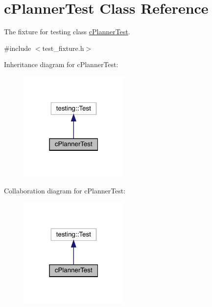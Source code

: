 \hypertarget{classc_planner_test}{}\section{c\+Planner\+Test Class Reference}
\label{classc_planner_test}


The fixture for testing class \mbox{\hyperlink{classc_planner_test}{c\+Planner\+Test}}.  




{\ttfamily \#include $<$test\+\_\+fixture.\+h$>$}



Inheritance diagram for c\+Planner\+Test\+:\nopagebreak
\begin{figure}[H]
\begin{center}
\leavevmode
\includegraphics[width=154pt]{classc_planner_test__inherit__graph}
\end{center}
\end{figure}


Collaboration diagram for c\+Planner\+Test\+:\nopagebreak
\begin{figure}[H]
\begin{center}
\leavevmode
\includegraphics[width=154pt]{classc_planner_test__coll__graph}
\end{center}
\end{figure}
